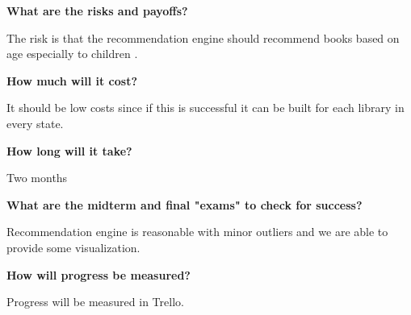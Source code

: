 \textbf{ What are the risks and payoffs?}
 
    The risk is that the recommendation engine should recommend books based on age especially to children .
     
\textbf{How much will it cost?}
 
    It should be low costs since if this is successful it can be built for each library in every state.
 
\textbf{How long will it take?}
 
    Two months
     
\textbf{What are the midterm and final "exams" to check for success?}
 
    Recommendation engine is reasonable with minor outliers and we are able to provide some visualization.
 
\textbf{How will progress be measured?}
 
    Progress will be measured in Trello.
 